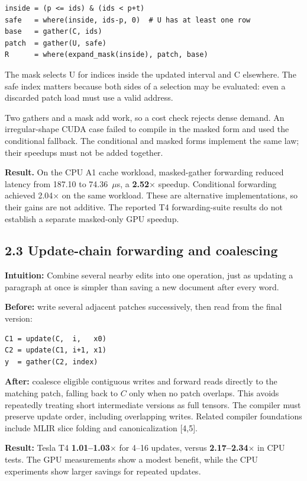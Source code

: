 \documentclass[10pt,a4paper]{article}
\begin{document}
\begin{lstlisting}
inside = (p <= ids) & (ids < p+t)
safe   = where(inside, ids-p, 0)  # U has at least one row
base   = gather(C, ids)
patch  = gather(U, safe)
R      = where(expand_mask(inside), patch, base)
\end{lstlisting}

The mask selects U for indices inside the updated interval
and C elsewhere. The safe index matters because both sides
of a selection may be evaluated: even a discarded patch load
must use a valid address.

Two gathers and a mask add work, so a cost check rejects
dense demand. An irregular-shape CUDA case failed to compile
in the masked form and used the conditional fallback.
The conditional and masked forms implement the same law;
their speedups must not be added together.

\textbf{Result.}
On the CPU A1 cache workload, masked-gather forwarding reduced
latency from 187.10 to 74.36~$\mu$s, a \textbf{2.52$\times$}
speedup. Conditional forwarding achieved 2.04$\times$ on the
same workload. These are alternative implementations, so their
gains are not additive. The reported T4 forwarding-suite results
do not establish a separate masked-only GPU speedup.

\subsection*{2.3 Update-chain forwarding and coalescing}
\textbf{Intuition:} Combine several nearby edits into one operation, just as updating a paragraph at once is simpler than saving a new document after every word.\par\textbf{Before:} write several adjacent patches successively, then read from the final version:
\begin{lstlisting}
C1 = update(C,  i,   x0)
C2 = update(C1, i+1, x1)
y  = gather(C2, index)
\end{lstlisting}
\textbf{After:} coalesce eligible contiguous writes and forward reads directly to the matching patch, falling back to $C$ only when no patch overlaps. This avoids repeatedly treating short intermediate versions as full tensors. The compiler must preserve update order, including overlapping writes. Related compiler foundations include MLIR slice folding and canonicalization [4,5].

\textbf{Result:} Tesla T4 \textbf{1.01--1.03$\times$} for 4--16 updates, versus \textbf{2.17--2.34$\times$} in CPU tests. The GPU measurements show a modest benefit, while the CPU experiments show larger savings for repeated updates.
\end{document}
